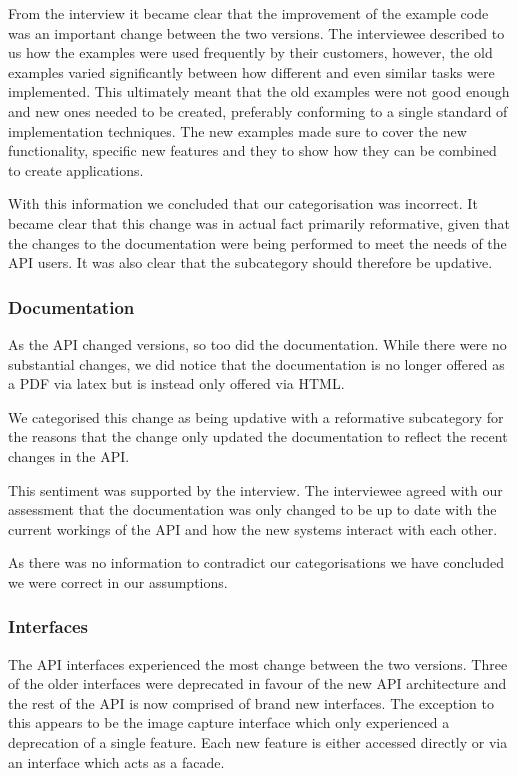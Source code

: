 \documentclass{sig-alternate}
\begin{document}
From the interview it became clear that the improvement of the example code was an important change between the two versions. The interviewee described to us how the examples were used frequently by their customers, however, the old examples varied significantly between how different and even similar tasks were implemented. This ultimately meant that the old examples were not good enough and new ones needed to be created, preferably conforming to a single standard of implementation techniques. The new examples made sure to cover the new functionality, specific new features and they to show how they can be combined to create applications.

With this information we concluded that our categorisation was incorrect. It became clear that this change was in actual fact primarily reformative, given that the changes to the documentation were being performed to meet the needs of the API users. It was also clear that the subcategory should therefore be updative. 

\subsubsection{Documentation}

As the API changed versions, so too did the documentation. While there were no substantial changes, we did notice that the documentation is no longer offered as a PDF via latex but is instead only offered via HTML. 

We categorised this change as being updative with a reformative subcategory for the reasons that the change only updated the documentation to reflect the recent changes in the API.

This sentiment was supported by the interview. The interviewee agreed with our assessment that the documentation was only changed to be up to date with the current workings of the API and how the new systems interact with each other.

As there was no information to contradict our categorisations we have concluded we were correct in our assumptions.

\subsubsection{Interfaces}

The API interfaces experienced the most change between the two versions. Three of the older interfaces were deprecated in favour of the new API architecture and the rest of the API is now comprised of brand new interfaces. The exception to this appears to be the image capture interface which only experienced a deprecation of a single feature. Each new feature is either accessed directly or via an interface which acts as a facade. 
\end{document}
